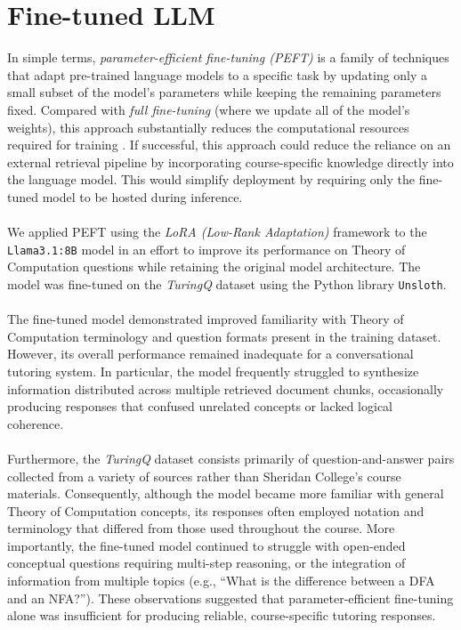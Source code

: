 \documentclass[12pt, a4paper]{report}
\begin{document}
\section{Fine-tuned LLM}
In simple terms, \textit{parameter-efficient fine-tuning (PEFT)} is a family of techniques that adapt pre-trained language models to a specific task by updating only a small subset of the model's parameters while keeping the remaining parameters fixed. Compared with \textit{full fine-tuning} (where we update all of the model's weights), this approach substantially reduces the computational resources required for training \cite{ibmPEFT2026}. If successful, this approach could reduce the reliance on an external retrieval pipeline by incorporating course-specific knowledge directly into the language model. This would simplify deployment by requiring only the fine-tuned model to be hosted during inference.~\\~\\
We applied PEFT using the \textit{LoRA (Low-Rank Adaptation)} framework \cite{lora2021} to the \texttt{Llama3.1:8B} model in an effort to improve its performance on Theory of Computation questions while retaining the original model architecture. The model was fine-tuned on the \textit{TuringQ} dataset \cite{turingQ2024} using the Python library \texttt{Unsloth}.~\\~\\
The fine-tuned model demonstrated improved familiarity with Theory of Computation terminology and question formats present in the training dataset. However, its overall performance remained inadequate for a conversational tutoring system. In particular, the model frequently struggled to synthesize information distributed across multiple retrieved document chunks, occasionally producing responses that confused unrelated concepts or lacked logical coherence.~\\~\\
Furthermore, the \textit{TuringQ} dataset consists primarily of question-and-answer pairs collected from a variety of sources rather than Sheridan College's course materials. Consequently, although the model became more familiar with general Theory of Computation concepts, its responses often employed notation and terminology that differed from those used throughout the course. More importantly, the fine-tuned model continued to struggle with open-ended conceptual questions requiring multi-step reasoning, or the integration of information from multiple topics (e.g., ``What is the difference between a DFA and an NFA?''). These observations suggested that parameter-efficient fine-tuning alone was insufficient for producing reliable, course-specific tutoring responses.
\end{document}
